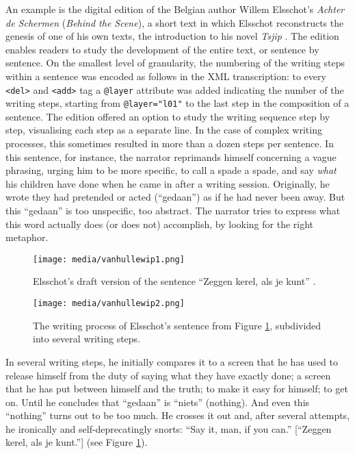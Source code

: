 \begin{paper}
An example is the digital edition of the Belgian author Willem
Elsschot's \emph{Achter de Schermen} (\emph{Behind the Scene}), a short
text in which Elsschot reconstructs the genesis of one of his own texts,
the introduction to his novel \emph{Tsjip} \citep{elsschot_achter_2007}. The edition
enables readers to study the development of the entire text, or sentence
by sentence. On the smallest level of granularity, the numbering of the
writing steps within a sentence was encoded as follows in the XML
transcription: to every \verb|<del>| and \verb|<add>| tag a \verb|@layer| attribute was added
indicating the number of the writing steps, starting from \verb|@layer="l01"|
to the last step in the composition of a sentence. The edition offered
an option to study the writing sequence step by step, visualising each
step as a separate line. In the case of complex writing processes, this
sometimes resulted in more than a dozen steps per sentence. In this
sentence, for instance, the narrator reprimands himself concerning a
vague phrasing, urging him to be more specific, to call a spade a spade,
and say \emph{what} his children have done when he came in after a
writing session. Originally, he wrote they had pretended or acted
(``gedaan'') as if he had never been away. But this ``gedaan'' is too
unspecific, too abstract. The narrator tries to express what this word
actually does (or does not) accomplish, by looking for the right
metaphor.

\begin{figure}[H]
    \centering
    \texttt{[image: media/vanhullewip1.png]}
    \caption{Elsschot's draft version of the sentence ``Zeggen kerel, als je kunt'' \citep[Letterenhuis E 285 H 5372, f. 3r]{elsschot_achter_2007}.}
    \label{fig:vanhulle:draft}
\end{figure}

\begin{figure}[H]
    \centering
    \texttt{[image: media/vanhullewip2.png]}
    \caption{The writing process of Elsschot's sentence from Figure \ref{fig:vanhulle:draft}, subdivided into several writing steps.}
    \label{fig:vanhulle:synoptic}
\end{figure}

\noindent In several writing steps, he initially compares it to a screen that he
has used to release himself from the duty of saying what they have
exactly done; a screen that he has put between himself and the truth; to
make it easy for himself; to get on. Until he concludes that ``gedaan''
is ``niets'' (nothing). And even this ``nothing'' turns out to be too
much. He crosses it out and, after several attempts, he ironically and
self-deprecatingly snorts: ``Say it, man, if you can.'' {[}``Zeggen kerel,
als je kunt.''{]} (see Figure \ref{fig:vanhulle:draft}).


\end{paper}
